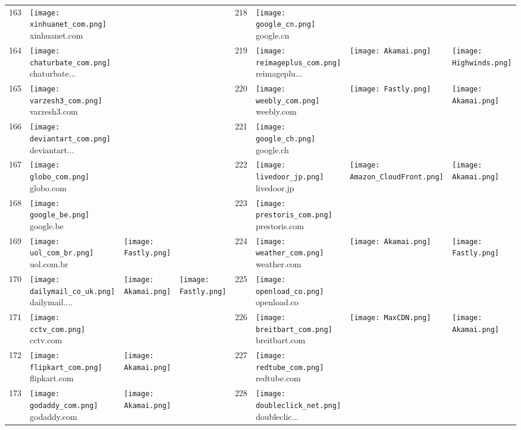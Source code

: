 \begin{table}[]
\begin{tabular}{|llll|llll|}
163 & \texttt{[image: xinhuanet\_com.png]} xinhuanet.com & & & 218 & \texttt{[image: google\_cn.png]} google.cn & & \\
164 & \texttt{[image: chaturbate\_com.png]} chaturbate... & & & 219 & \texttt{[image: reimageplus\_com.png]} reimageplu... & \texttt{[image: Akamai.png]} & \texttt{[image: Highwinds.png]} \\
165 & \texttt{[image: varzesh3\_com.png]} varzesh3.com & & & 220 & \texttt{[image: weebly\_com.png]} weebly.com & \texttt{[image: Fastly.png]} & \texttt{[image: Akamai.png]} \\
166 & \texttt{[image: deviantart\_com.png]} deviantart... & & & 221 & \texttt{[image: google\_ch.png]} google.ch & & \\
167 & \texttt{[image: globo\_com.png]} globo.com & & & 222 & \texttt{[image: livedoor\_jp.png]} livedoor.jp & \texttt{[image: Amazon\_CloudFront.png]} & \texttt{[image: Akamai.png]} \\
168 & \texttt{[image: google\_be.png]} google.be & & & 223 & \texttt{[image: prestoris\_com.png]} prestoris.com & & \\
169 & \texttt{[image: uol\_com\_br.png]} uol.com.br & \texttt{[image: Fastly.png]} & & 224 & \texttt{[image: weather\_com.png]} weather.com & \texttt{[image: Akamai.png]} & \texttt{[image: Fastly.png]} \\
170 & \texttt{[image: dailymail\_co\_uk.png]} dailymail.... & \texttt{[image: Akamai.png]} & \texttt{[image: Fastly.png]} & 225 & \texttt{[image: openload\_co.png]} openload.co & & \\
171 & \texttt{[image: cctv\_com.png]} cctv.com & & & 226 & \texttt{[image: breitbart\_com.png]} breitbart.com & \texttt{[image: MaxCDN.png]} & \texttt{[image: Akamai.png]} \\
172 & \texttt{[image: flipkart\_com.png]} flipkart.com & \texttt{[image: Akamai.png]} & & 227 & \texttt{[image: redtube\_com.png]} redtube.com & & \\
173 & \texttt{[image: godaddy\_com.png]} godaddy.com & \texttt{[image: Akamai.png]} & & 228 & \texttt{[image: doubleclick\_net.png]} doubleclic... & & \\

\end{tabular}
\end{table}
